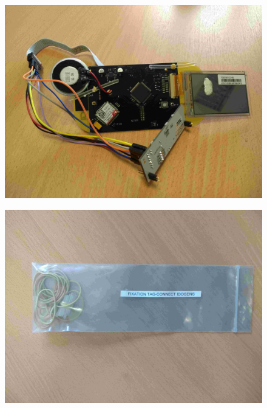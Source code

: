 \documentclass{article}
\begin{document}
\begin{figure}[H]
\begin{center}
\advance\leftskip-3cm
\advance\rightskip-3cm
\includegraphics[keepaspectratio=true,scale=0.1]{fixation_tag-connectdos.jpg}
\label{visina8}
\end{center}\end{figure}

\begin{figure}[H]
\begin{center}
\advance\leftskip-3cm
\advance\rightskip-3cm
\includegraphics[keepaspectratio=true,scale=0.1]{fixation_tagconnect_idosens.jpg}
\label{visina8}
\end{center}\end{figure}
\end{document}

